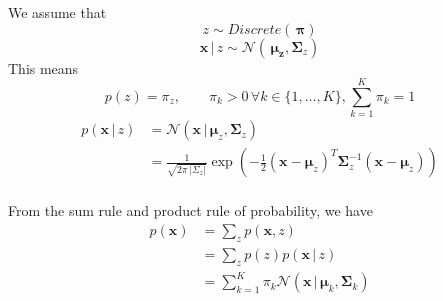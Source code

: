 \documentclass[final,3p,times,twocolumn]{elsarticle}
\begin{document}
We assume that 
\begin{equation}
z \sim Discrete(\,\boldsymbol \pi)
\label{eqnzdistro}
\end{equation}
\begin{equation}
\boldsymbol x \,|\, z \sim \mathcal{N}(\,\boldsymbol{\mu_z}, \boldsymbol \Sigma_z)
\label{eqn:x|z-distro}
\end{equation}
This means
\begin{equation}
p(z) = \pi_z, \qquad \pi_k > 0 \, \forall k \in \{1,\dots,K\}, \sum_{k=1}^K \pi_k = 1 
\end{equation}
\begin{equation}
\begin{split}
p(\boldsymbol x\,|\,z) &= \mathcal{N}(\boldsymbol x\,|\, \boldsymbol \mu_z, \boldsymbol \Sigma_z) \\
&= \frac{1}{\sqrt{2\pi\,|\Sigma_z|}}\exp(-\frac{1}{2}(\boldsymbol x - \boldsymbol \mu_z)^T\boldsymbol \Sigma_z^{-1} (\boldsymbol x - \boldsymbol \mu_z))\\
\end{split}
\end{equation}

From the sum rule and product rule of probability, we have
\begin{equation}
\begin{split}
p(\boldsymbol x) &= \sum_z p(\boldsymbol x, z) \\
&= \sum_z p(z)p(\boldsymbol x \,|\, z)\\
&= \sum_{k=1}^K \pi_k \mathcal{N}(\boldsymbol x\,|\,\boldsymbol \mu_k, \boldsymbol \Sigma_k)
\label{eqn:gmmdensity}
\end{split}
\end{equation}
\end{document}
